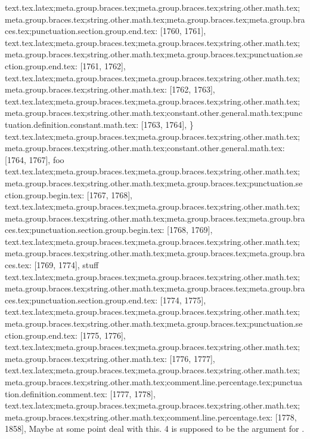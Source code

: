 {{{{{{{{{{{{{{{{{{{{{{{{{{{{{{{{{{{{{{{{{{{{{{{{{text.tex.latex;meta.group.braces.tex;meta.group.braces.tex;string.other.math.tex;meta.group.braces.tex;string.other.math.tex;meta.group.braces.tex;meta.group.braces.tex;punctuation.section.group.end.tex: [1760, 1761], {}}
text.tex.latex;meta.group.braces.tex;meta.group.braces.tex;string.other.math.tex;meta.group.braces.tex;string.other.math.tex;meta.group.braces.tex;punctuation.section.group.end.tex: [1761, 1762], {}}
text.tex.latex;meta.group.braces.tex;meta.group.braces.tex;string.other.math.tex;meta.group.braces.tex;string.other.math.tex: [1762, 1763], {
}
text.tex.latex;meta.group.braces.tex;meta.group.braces.tex;string.other.math.tex;meta.group.braces.tex;string.other.math.tex;constant.other.general.math.tex;punctuation.definition.constant.math.tex: [1763, 1764], {\}
text.tex.latex;meta.group.braces.tex;meta.group.braces.tex;string.other.math.tex;meta.group.braces.tex;string.other.math.tex;constant.other.general.math.tex: [1764, 1767], {foo}
text.tex.latex;meta.group.braces.tex;meta.group.braces.tex;string.other.math.tex;meta.group.braces.tex;string.other.math.tex;meta.group.braces.tex;punctuation.section.group.begin.tex: [1767, 1768], {{}
text.tex.latex;meta.group.braces.tex;meta.group.braces.tex;string.other.math.tex;meta.group.braces.tex;string.other.math.tex;meta.group.braces.tex;meta.group.braces.tex;punctuation.section.group.begin.tex: [1768, 1769], {{}
text.tex.latex;meta.group.braces.tex;meta.group.braces.tex;string.other.math.tex;meta.group.braces.tex;string.other.math.tex;meta.group.braces.tex;meta.group.braces.tex: [1769, 1774], {stuff}
text.tex.latex;meta.group.braces.tex;meta.group.braces.tex;string.other.math.tex;meta.group.braces.tex;string.other.math.tex;meta.group.braces.tex;meta.group.braces.tex;punctuation.section.group.end.tex: [1774, 1775], {}}
text.tex.latex;meta.group.braces.tex;meta.group.braces.tex;string.other.math.tex;meta.group.braces.tex;string.other.math.tex;meta.group.braces.tex;punctuation.section.group.end.tex: [1775, 1776], {}}
text.tex.latex;meta.group.braces.tex;meta.group.braces.tex;string.other.math.tex;meta.group.braces.tex;string.other.math.tex: [1776, 1777], {
}
text.tex.latex;meta.group.braces.tex;meta.group.braces.tex;string.other.math.tex;meta.group.braces.tex;string.other.math.tex;comment.line.percentage.tex;punctuation.definition.comment.tex: [1777, 1778], {%
text.tex.latex;meta.group.braces.tex;meta.group.braces.tex;string.other.math.tex;meta.group.braces.tex;string.other.math.tex;comment.line.percentage.tex: [1778, 1858], { Maybe at some point deal with this. 4 is supposed to be the argument for \foo.
}}}}}}}}}}}}}}}}}}}}}}}}}}}}}}}}}}}}}}}}}}}}}}}}}}
